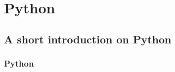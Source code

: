 
\section{Python}\label{sec:python}

\subsection{A short introduction on Python}

\begin{frame}
  \MyLogo
  \frametitle{Python}  

\end{frame}